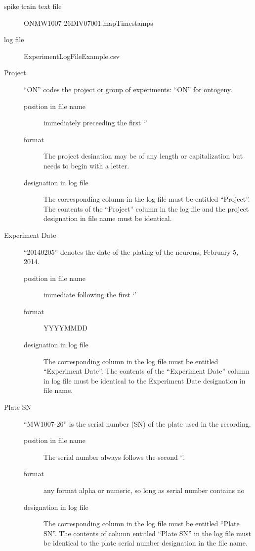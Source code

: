 \documentclass{article}\usepackage[]{graphicx}\usepackage[]{color}
\begin{document}
\begin{description}
\item[spike train text file]
ON\textunderscore MW1007-26\textunderscore DIV07\textunderscore 001.mapTimestamps 
\item[log file] Experiment\textunderscore LogFileExample.csv
\end{description}


\begin{description}

\item[Project] ``ON'' codes the project or group of experiments: ``ON'' for ontogeny. 
\begin{description}
\item[position in file name] immediately preceeding the first `\textunderscore '
\item[format] The project desination may be of any length or capitalization but needs to begin with a letter.
\item[designation in log file] The corresponding column in the log file must be entitled ``Project''. The contents of the ``Project'' column in the log file and the project designation in file name must be identical.
\end{description}


\item[Experiment Date] ``20140205'' denotes the date of the plating of the neurons, February 5, 2014. 
\begin{description}
\item[position in file name] immediate following the first `\textunderscore '
\item[format] YYYYMMDD 
\item[designation in log file] The corresponding column in the log file must be entitled ``Experiment Date''. The contents of the ``Experiment Date'' column in log file must be identical to the Experiment Date designation in file name.
\end{description}


\item[Plate SN ]  ``MW1007-26'' is the serial number (SN) of the plate used in the recording.  
\begin{description}
\item[position in file name] The serial number always follows the second `\textunderscore '.
\item[format] any format alpha or numeric, so long as serial number contains no  \textunderscore
\item[designation in log file] The corresponding column in the log file must be entitled ``Plate SN''. The contents of column entitled ``Plate SN'' in the log file must be identical to the plate serial number designation in the file name.
\end{description}


\end{description}
\end{document}
